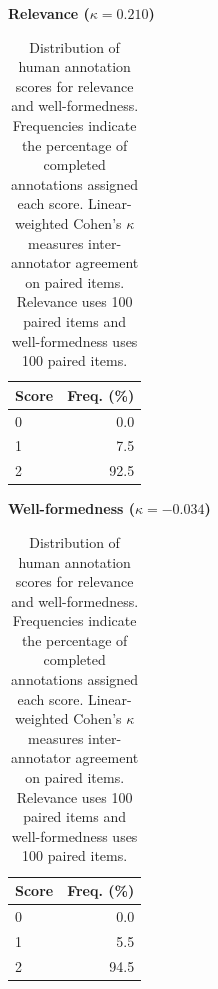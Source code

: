 \begin{table}[t]
\centering
\footnotesize
\caption{Distribution of human annotation scores for relevance and
well-formedness. Frequencies indicate the percentage of completed
annotations assigned each score. Linear-weighted Cohen's $\kappa$
measures inter-annotator agreement on paired items.
Relevance uses 100 paired items and well-formedness uses 100 paired items.}
\label{tab:annotation-results}

\begin{minipage}[t]{0.48\textwidth}
\centering
\textbf{Relevance ($\kappa = 0.210$)}\\[4pt]
\begin{tabularx}{\linewidth}{@{}Xr@{}}
\toprule
\textbf{Score} & \textbf{Freq. (\%)} \\
\midrule
0 & 0.0 \\
1 & 7.5 \\
2 & 92.5 \\
\bottomrule
\end{tabularx}
\end{minipage}
\hfill
\begin{minipage}[t]{0.48\textwidth}
\centering
\textbf{Well-formedness ($\kappa = -0.034$)}\\[4pt]
\begin{tabularx}{\linewidth}{@{}Xr@{}}
\toprule
\textbf{Score} & \textbf{Freq. (\%)} \\
\midrule
0 & 0.0 \\
1 & 5.5 \\
2 & 94.5 \\
\bottomrule
\end{tabularx}
\end{minipage}

\vspace{-0.5cm}
\end{table}

